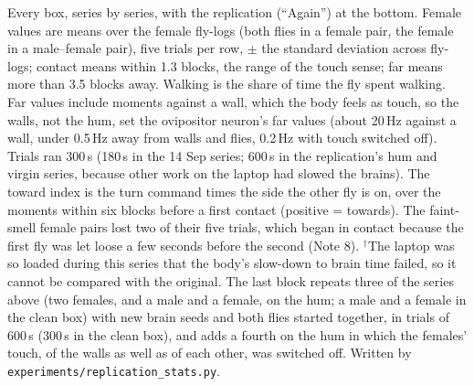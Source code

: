 \begin{table}[h]
\caption{Every box, series by series, with the replication (``Again'') at the bottom. Female values are means over the female fly-logs (both flies in a female pair, the female in a male--female pair), five trials per row, $\pm$ the standard deviation across fly-logs; contact means within 1.3 blocks, the range of the touch sense; far means more than 3.5 blocks away. Walking is the share of time the fly spent walking. Far values include moments against a wall, which the body feels as touch, so the walls, not the hum, set the ovipositor neuron's far values (about 20\,Hz against a wall, under 0.5\,Hz away from walls and flies, 0.2\,Hz with touch switched off). Trials ran 300\,s (180\,s in the 14 Sep series; 600\,s in the replication's hum and virgin series, because other work on the laptop had slowed the brains). The toward index is the turn command times the side the other fly is on, over the moments within six blocks before a first contact (positive = towards). The faint-smell female pairs lost two of their five trials, which began in contact because the first fly was let loose a few seconds before the second (Note 8). $^\dagger$The laptop was so loaded during this series that the body's slow-down to brain time failed, so it cannot be compared with the original. The last block repeats three of the series above (two females, and a male and a female, on the hum; a male and a female in the clean box) with new brain seeds and both flies started together, in trials of 600\,s (300\,s in the clean box), and adds a fourth on the hum in which the females' touch, of the walls as well as of each other, was switched off. Written by \texttt{experiments/replication\_stats.py}.}
\label{tab:arena}
\end{table}

